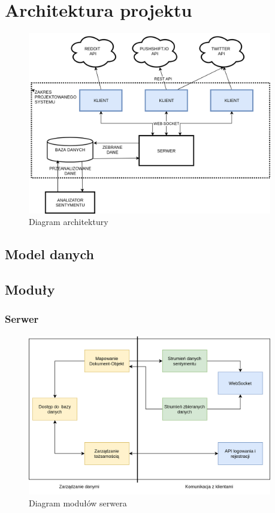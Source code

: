 \section{Architektura projektu}
\begin{figure}[h!]
  \centering
    \includegraphics[width=0.95\textwidth]{img/architecture.png}
  \caption{Diagram architektury}
  \label{fig:arch}
\end{figure}
\newpage
\subsection{Model danych}
\subsection{Moduły}
\subsubsection{Serwer}
\begin{figure}[h!]
  \centering
    \includegraphics[width=0.95\textwidth]{img/serwer-modules.png}
  \caption{Diagram modułów serwera}
  \label{fig:server}
\end{figure}
